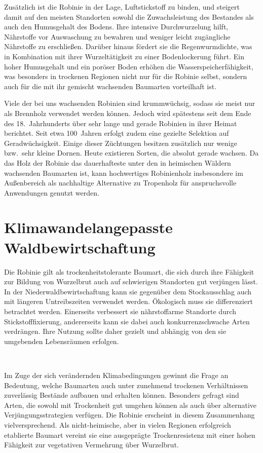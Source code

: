 \documentclass[twocolumn]{scrartcl}
\makeatletter
\newcommand{\summary}[1]{%
  \par %
  {\small\sffamily
    \noindent #1\par}
  \vspace{-0.4em}
  \noindent\makebox[\linewidth]{\rule{0.33\linewidth}{0.4pt}}\\[-1.2em]
  \@afterindentfalse\@afterheading
}
\makeatother
\begin{document}
Zusätzlich ist die Robinie in der Lage, Luftstickstoff zu binden, und
steigert damit auf den meisten Standorten sowohl die Zuwachsleistung
des Bestandes als auch den Humusgehalt des Bodens. Ihre intensive
Durchwurzelung hilft, Nährstoffe vor Auswaschung zu bewahren und
weniger leicht zugängliche Nährstoffe zu erschließen. Darüber hinaus
fördert sie die Regenwurmdichte, was in Kombination mit ihrer
Wurzeltätigkeit zu einer Bodenlockerung führt. Ein hoher Humusgehalt
und ein poröser Boden erhöhen die Wasserspeicherfähigkeit, was
besonders in trockenen Regionen nicht nur für die Robinie selbst,
sondern auch für die mit ihr gemischt wachsenden Baumarten vorteilhaft
ist.

Viele der bei uns wachsenden Robinien sind krummwüchsig, sodass sie
meist nur als Brennholz verwendet werden können. Jedoch wird
spätestens seit dem Ende des 18.\ Jahrhunderts über sehr lange und
gerade Robinien in ihrer Heimat berichtet. Seit etwa 100~Jahren
erfolgt zudem eine gezielte Selektion auf Geradwüchsigkeit. Einige
dieser Züchtungen besitzen zusätzlich nur wenige bzw.\ sehr kleine
Dornen. Heute existieren Sorten, die absolut gerade wachsen. Da das
Holz der Robinie das dauerhafteste unter den in heimischen Wäldern
wachsenden Baumarten ist, kann hochwertiges Robinienholz insbesondere
im Außenbereich als nachhaltige Alternative zu Tropenholz für
anspruchsvolle Anwendungen genutzt werden.


\section{Klimawandelangepasste Waldbewirtschaftung}

\summary{Die Robinie gilt als trockenheitstolerante Baumart, die sich
  durch ihre Fähigkeit zur Bildung von Wurzelbrut auch auf schwierigen
  Standorten gut verjüngen lässt. In der Niederwaldbewirtschaftung
  kann sie gegenüber dem Stockausschlag auch mit längeren
  Untreibszeiten verwendet werden. Ökologisch muss sie differenziert
  betrachtet werden. Einerseits verbessert sie nährstoffarme Standorte
  durch Stickstofffixierung, andererseits kann sie dabei auch
  konkurrenzschwache Arten verdrängen. Ihre Nutzung sollte daher
  gezielt und abhängig von den sie umgebenden Lebensräumen erfolgen.}

Im Zuge der sich verändernden Klimabedingungen gewinnt die Frage an
Bedeutung, welche Baumarten auch unter zunehmend trockenen
Verhältnissen zuverlässig Bestände aufbauen und erhalten
können. Besonders gefragt sind Arten, die sowohl mit Trockenheit gut
umgehen können als auch über alternative Verjüngungsstrategien
verfügen. Die Robinie erscheint in diesem Zusammenhang
vielversprechend. Als nicht-heimische, aber in vielen Regionen
erfolgreich etablierte Baumart vereint sie eine ausgeprägte
Trockenresistenz mit einer hohen Fähigkeit zur vegetativen Vermehrung
über Wurzelbrut.
\end{document}

